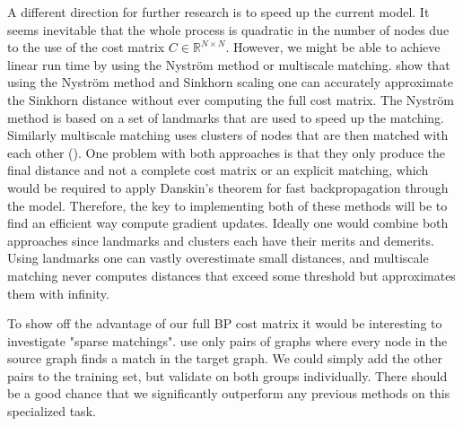 A different direction for further research is to speed up the current model. It seems inevitable that the whole process is quadratic in the number of nodes due to the use of the cost matrix $C \in \mathbb{R}^{N \times N}$. However, we might be able to achieve linear run time by using the Nystr{\"{o}}m method or multiscale matching. \cite{nytrom2019} show that using the Nystr{\"{o}}m method and Sinkhorn scaling one can accurately approximate the Sinkhorn distance without ever computing the full cost matrix. The Nystr{\"{o}}m method is based on a set of landmarks that are used to speed up the matching. Similarly multiscale matching uses clusters of nodes that are then matched with each other (\citealp{multiscale2016}). One problem with both approaches is that they only produce the final distance and not a complete cost matrix or an explicit matching, which would be required to apply Danskin's theorem for fast backpropagation through the model. Therefore, the key to implementing both of these methods will be to find an efficient way compute gradient updates. Ideally one would combine both approaches since landmarks and clusters each have their merits and demerits. Using landmarks one can vastly overestimate small distances, and multiscale matching never computes distances that exceed some threshold but approximates them with infinity.

To show off the advantage of our full BP cost matrix it would be interesting to investigate "sparse matchings". \cite{fey2020_update} use only pairs of graphs where every node in the source graph finds a match in the target graph. We could simply add the other pairs to the training set, but validate on both groups individually. There should be a good chance that we significantly outperform any previous methods on this specialized task.
